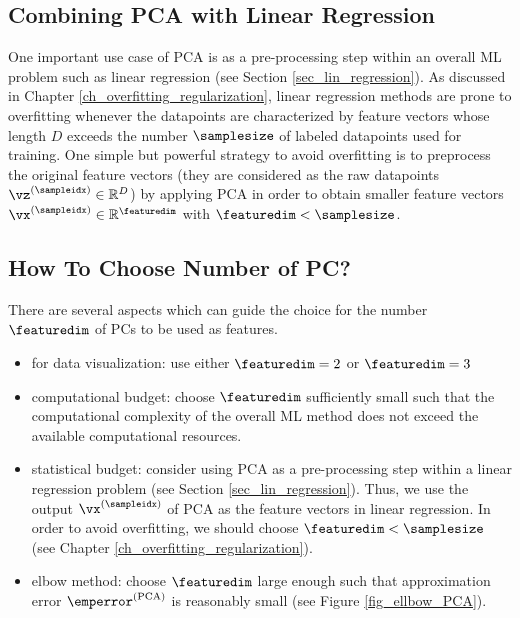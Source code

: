 \documentclass[12pt]{report}
\begin{document}
\subsection{Combining PCA with Linear Regression} 

One important use case of PCA is as a pre-processing step within an overall ML problem 
such as linear regression (see Section \ref{sec_lin_regression}). As discussed in Chapter 
\ref{ch_overfitting_regularization}, linear regression methods are prone to overfitting 
whenever the datapoints are characterized by feature vectors whose length $D$ exceeds 
the number $\samplesize$ of labeled datapoints used for training. One simple but powerful 
strategy to avoid overfitting is to preprocess the original feature vectors (they are considered 
as the raw datapoints $\vz^{(\sampleidx)}\in \mathbb{R}^{D}$) by applying PCA in order to obtain 
smaller feature vectors $\vx^{(\sampleidx)} \in \mathbb{R}^{\featuredim}$ with $\featuredim < \samplesize$. 



\subsection{How To Choose Number of PC?} 
There are several aspects which can guide the choice for the number $\featuredim$ of PCs to be used as features. 
\begin{itemize}
\item for data visualization: use either $\featuredim=2$ or $\featuredim=3$ 
\item computational budget: choose $\featuredim$ sufficiently small such 
that the computational complexity of the overall ML method does not exceed 
the available computational resources.  
\item statistical budget: consider using PCA as a pre-processing step within a linear 
regression problem (see Section \ref{sec_lin_regression}). Thus, we use the output 
$\vx^{(\sampleidx)}$ of PCA as the feature vectors in linear regression. In order to avoid 
overfitting, we should choose $\featuredim < \samplesize$ (see Chapter \ref{ch_overfitting_regularization}). 
\item elbow method: choose $\featuredim$ large enough such that approximation 
error $\emperror^{(\rm PCA)}$ is reasonably small (see Figure \ref{fig_ellbow_PCA}). 
\end{itemize} 
\end{document}
